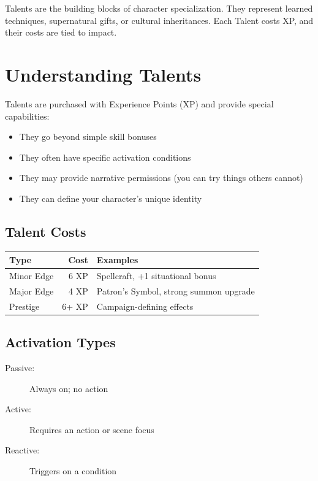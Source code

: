\documentclass[11pt,twoside,openany]{book}
\begin{document}
Talents are the building blocks of character specialization. They represent learned techniques, supernatural gifts, or cultural inheritances. Each Talent costs XP, and their costs are tied to impact.

\section*{Understanding Talents} 

Talents are purchased with Experience Points (XP) and provide special capabilities:
\begin{itemize}
\item They go beyond simple skill bonuses
\item They often have specific activation conditions
\item They may provide narrative permissions (you can try things others cannot)
\item They can define your character's unique identity
\end{itemize}

\subsection*{Talent Costs}

\begin{center}
\begin{tabular}{|l|r|l|}
\hline
\textbf{Type} & \textbf{Cost} & \textbf{Examples} \\
\hline
Minor Edge & 6 XP & Spellcraft, +1 situational bonus \\
Major Edge & 4 XP & Patron's Symbol, strong summon upgrade \\
Prestige & 6+ XP & Campaign-defining effects \\
\hline
\end{tabular}
\end{center}

\subsection*{Activation Types}

\begin{description}
\item[Passive:] Always on; no action
\item[Active:] Requires an action or scene focus
\item[Reactive:] Triggers on a condition
\end{description}
\end{document}
